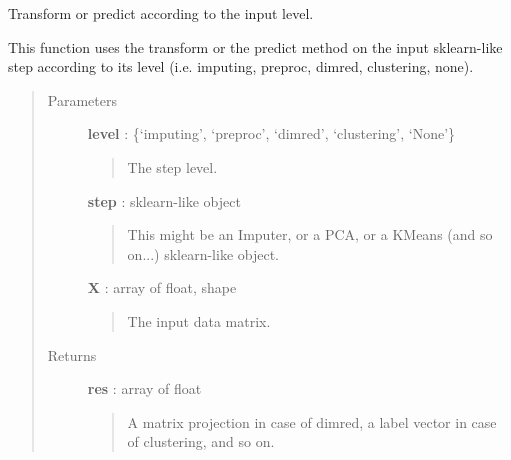 \documentclass[letterpaper,10pt,english]{sphinxmanual}
\begin{document}

\begin{fulllineitems}
\label{index:adenine.core.pipelines.evaluate}
Transform or predict according to the input level.

This function uses the transform or the predict method on the input sklearn-like step according to its level (i.e. imputing, preproc, dimred, clustering, none).
\begin{quote}\begin{description}
\item[{Parameters}] \leavevmode
\textbf{level} : \{`imputing', `preproc', `dimred', `clustering', `None'\}
\begin{quote}

The step level.
\end{quote}

\textbf{step} : sklearn-like object
\begin{quote}

This might be an Imputer, or a PCA, or a KMeans (and so on...) sklearn-like object.
\end{quote}

\textbf{X} : array of float, shape
\begin{quote}

The input data matrix.
\end{quote}

\item[{Returns}] \leavevmode
\textbf{res} : array of float
\begin{quote}

A matrix projection in case of dimred, a label vector in case of clustering, and so on.
\end{quote}

\end{description}\end{quote}

\end{fulllineitems}

\end{document}
